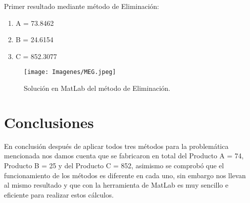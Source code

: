 \documentclass[fleqn,10pt]{olplainarticle}
\begin{document}
Primer resultado mediante método de Eliminación:

\begin{enumerate}[noitemsep] 
\item A = 73.8462
\item B = 24.6154
\item C = 852.3077
\end{enumerate}

\begin{figure}[h!]
\centering
\texttt{[image: Imagenes/MEG.jpeg]}
\caption{Solución en MatLab del método de Eliminación.}
\end{figure}



\section*{Conclusiones}

En conclusión después de aplicar todos tres métodos para la problemática mencionada nos damos cuenta que se fabricaron en total del Producto A = 74, Producto B = 25 y del Producto C = 852, asimismo se comprobó que el funcionamiento de los métodos es diferente en cada uno, sin embargo nos llevan al mismo resultado y que con la herramienta de MatLab es muy sencillo e eficiente para realizar estos cálculos.
\end{document}
